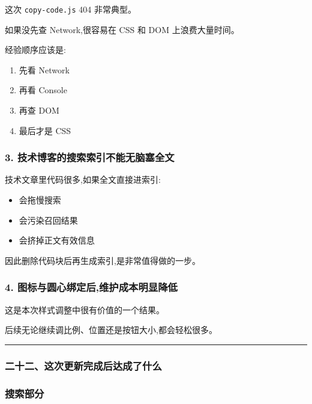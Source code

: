 \documentclass[lang=cn,scheme=chinese,color=blue,device=normal,toc=onecol,math=cm]{elegantbook}
\begin{document}
这次 \texttt{copy-code.js} 404 非常典型。\par


如果没先查 Network,很容易在 CSS 和 DOM 上浪费大量时间。\par


经验顺序应该是:\par


\begin{enumerate}
\item 先看 Network
\item 再看 Console
\item 再查 DOM
\item 最后才是 CSS
\end{enumerate}


\subsubsection{3. 技术博客的搜索索引不能无脑塞全文}


技术文章里代码很多,如果全文直接进索引:\par


\begin{itemize}
\item 会拖慢搜索
\item 会污染召回结果
\item 会挤掉正文有效信息
\end{itemize}


因此删除代码块后再生成索引,是非常值得做的一步。\par


\subsubsection{4. 图标与圆心绑定后,维护成本明显降低}


这是本次样式调整中很有价值的一个结果。\par


后续无论继续调比例、位置还是按钮大小,都会轻松很多。\par


\medskip\hrule\medskip


\subsubsection{二十二、这次更新完成后达成了什么}


\subsubsection{搜索部分}
\end{document}
